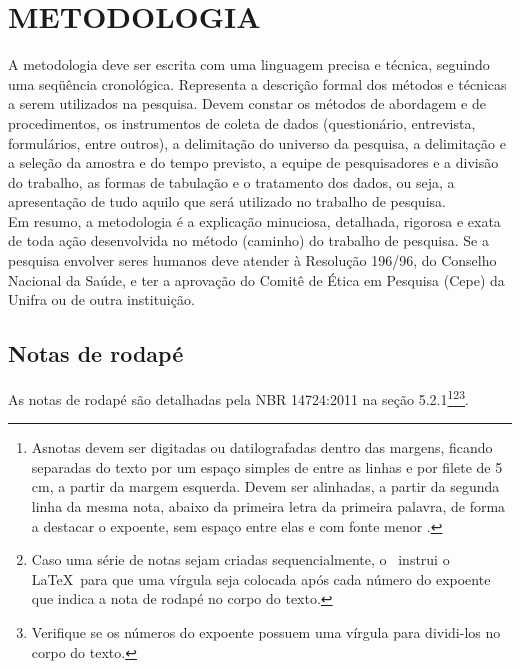 \chapter{METODOLOGIA}
\label{chap:metodologia}
A metodologia deve ser escrita com uma linguagem precisa e técnica, seguindo uma
seqüência cronológica. Representa a descrição formal dos métodos e técnicas a serem
utilizados na pesquisa. Devem constar os métodos de abordagem e de procedimentos, os
instrumentos de coleta de dados (questionário, entrevista, formulários, entre outros), a
delimitação do universo da pesquisa, a delimitação e a seleção da amostra e do tempo
previsto, a equipe de pesquisadores e a divisão do trabalho, as formas de tabulação e o
tratamento dos dados, ou seja, a apresentação de tudo aquilo que será utilizado no trabalho de
pesquisa.\\
Em resumo, a metodologia é a explicação minuciosa, detalhada, rigorosa e exata de
toda ação desenvolvida no método (caminho) do trabalho de pesquisa.
Se a pesquisa envolver seres humanos deve atender à Resolução 196/96, do Conselho
Nacional da Saúde, e ter a aprovação do Comitê de Ética em Pesquisa (Cepe) da Unifra ou de
outra instituição.\\
\section{Notas de rodapé }
As notas de rodapé são detalhadas pela NBR 14724:2011 na seção 5.2.1\footnote{Asnotas devem ser digitadas ou datilografadas dentro das margens, ficando
separadas do texto por um espaço simples de entre as linhas e por filete de 5
cm, a partir da margem esquerda. Devem ser alinhadas, a partir da segunda linha
da mesma nota, abaixo da primeira letra da primeira palavra, de forma a destacar
o expoente, sem espaço entre elas e com fonte menor
.}\footnote{Caso uma série de notas sejam
criadas sequencialmente, o \abnTeX\ instrui o \LaTeX\ para que uma vírgula seja
colocada após cada número do expoente que indica a nota de rodapé no corpo do
texto.}\footnote{Verifique se os números do expoente possuem uma vírgula para
dividi-los no corpo do texto.}. 